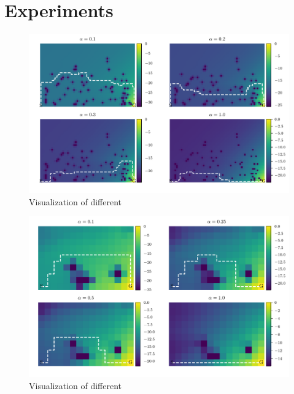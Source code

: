 

\section{Experiments}\label{sec:qexperiments}


\begin{figure}[h]
\center
\includegraphics[width=\linewidth]{gfx/vi_optimal_paths.pdf}
\caption{Visualization of different}
\label{fig:qgrid}
\end{figure}


\begin{figure}[h]
\center
\includegraphics[width=\linewidth]{gfx/q_optimal_paths.pdf}
\caption{Visualization of different}
\label{fig:qgrid}
\end{figure}


